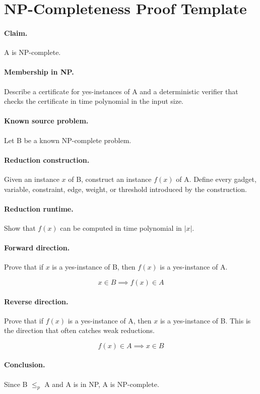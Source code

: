 
\newcommand{\problemB}{B}
\newcommand{\problemA}{A}
\newcommand{\polyreduce}{\ensuremath{\le_p}}

\section*{NP-Completeness Proof Template}

\paragraph{Claim.}
\problemA{} is NP-complete.

\paragraph{Membership in NP.}
Describe a certificate for yes-instances of \problemA{} and a deterministic verifier
that checks the certificate in time polynomial in the input size.

\paragraph{Known source problem.}
Let \problemB{} be a known NP-complete problem.

\paragraph{Reduction construction.}
Given an instance $x$ of \problemB{}, construct an instance $f(x)$ of \problemA{}.
Define every gadget, variable, constraint, edge, weight, or threshold introduced by
the construction.

\paragraph{Reduction runtime.}
Show that $f(x)$ can be computed in time polynomial in $|x|$.

\paragraph{Forward direction.}
Prove that if $x$ is a yes-instance of \problemB{}, then $f(x)$ is a yes-instance
of \problemA{}.

\[
x \in \problemB{} \implies f(x) \in \problemA{}
\]

\paragraph{Reverse direction.}
Prove that if $f(x)$ is a yes-instance of \problemA{}, then $x$ is a yes-instance
of \problemB{}. This is the direction that often catches weak reductions.

\[
f(x) \in \problemA{} \implies x \in \problemB{}
\]

\paragraph{Conclusion.}
Since \problemB{} \polyreduce{} \problemA{} and \problemA{} is in NP,
\problemA{} is NP-complete.
